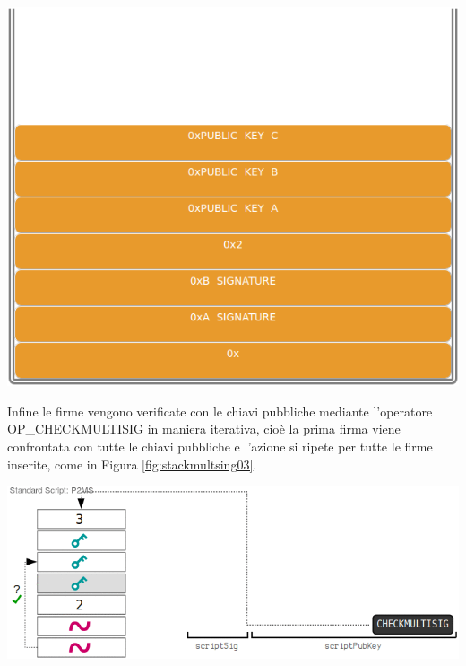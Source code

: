 {\centering
\vspace{15pt}
\includegraphics[scale=0.35]{images/script/multisig/2.png}
\vspace{10pt}
\par}

Infine le firme vengono verificate con le chiavi pubbliche mediante l’operatore OP\_CHECK\-MULTI\-SIG in maniera iterativa, cioè la prima firma viene confrontata con tutte le chiavi pubbliche e l’azione si ripete per tutte le firme inserite, come in Figura \ref{fig:stackmultsing03}.

{\centering
\vspace{15pt}
\includegraphics[scale=0.35]{images/script/multisig/3.png}
\vspace{10pt}
\par}

